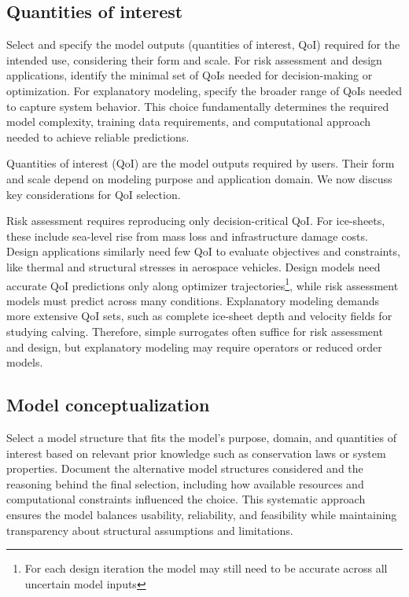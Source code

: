\subsection{Quantities of interest}

\begin{essrec}
Select and specify the model outputs (quantities of interest, QoI) required for the intended use, considering their form and scale. For risk assessment and design applications, identify the minimal set of QoIs needed for decision-making or optimization. For explanatory modeling, specify the broader range of QoIs needed to capture system behavior. This choice fundamentally determines the required model complexity, training data requirements, and computational approach needed to achieve reliable predictions.
\end{essrec}

Quantities of interest (QoI) are the model outputs required by users. Their form and scale depend on modeling purpose and application domain. We now discuss key considerations for QoI selection.

Risk assessment requires reproducing only decision-critical QoI. For ice-sheets, these include sea-level rise from mass loss and infrastructure damage costs. Design applications similarly need few QoI to evaluate objectives and constraints, like thermal and structural stresses in aerospace vehicles. Design models need accurate QoI predictions only along optimizer trajectories\footnote{For each design iteration the model may still need to be accurate across all uncertain model inputs}, while risk assessment models must predict across many conditions. Explanatory modeling demands more extensive QoI sets, such as complete ice-sheet depth and velocity fields for studying calving. Therefore, simple surrogates often suffice for risk assessment and design, but explanatory modeling may require operators or reduced order models.


\subsection{Model conceptualization}


\begin{essrec}
Select a model structure that fits the model's purpose, domain, and quantities of interest based on relevant prior knowledge such as conservation laws or system properties. Document the alternative model structures considered and the reasoning behind the final selection, including how available resources and computational constraints influenced the choice. This systematic approach ensures the model balances usability, reliability, and feasibility while maintaining transparency about structural assumptions and limitations.
\end{essrec}

